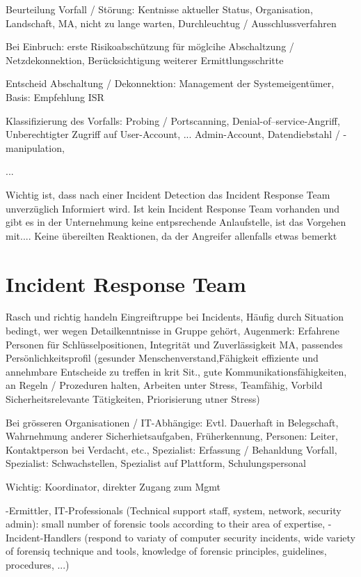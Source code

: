Beurteilung Vorfall / Störung: Kentnisse aktueller Status, Organisation, Landschaft, MA, nicht zu lange warten, Durchleuchtug / Ausschlussverfahren

Bei Einbruch: erste Risikoabschützung für möglcihe Abschaltzung / Netzdekonnektion, Berücksichtigung weiterer Ermittlungsschritte

Entscheid Abschaltung / Dekonnektion: Management der Systemeigentümer, Basis: Empfehlung ISR

Klassifizierung  des Vorfalls: Probing  / Portscanning, Denial-of--service-Angriff, Unberechtigter Zugriff auf User-Account, ... Admin-Account, Datendiebstahl / -manipulation,

...

Wichtig ist, dass nach einer Incident Detection das Incident Response Team unverzüglich Informiert wird. Ist kein Incident Response Team vorhanden und gibt es in der Unternehmung keine entpsrechende Anlaufstelle, ist das Vorgehen mit....
Keine übereilten Reaktionen, da der Angreifer allenfalls etwas bemerkt



\section{Incident Response Team}
Rasch und richtig handeln
Eingreiftruppe bei Incidents, Häufig durch Situation bedingt, wer wegen Detailkenntnisse in Gruppe gehört,
Augenmerk: Erfahrene Personen für Schlüsselpositionen, Integrität und Zuverlässigkeit MA, passendes Persönlichkeitsprofil (gesunder Menschenverstand,Fähigkeit effiziente und annehmbare Entscheide zu treffen in krit Sit., gute Kommunikationsfähigkeiten, an Regeln / Prozeduren halten, Arbeiten unter Stress, Teamfähig, Vorbild Sicherheitsrelevante Tätigkeiten, Priorisierung utner Stress)

Bei grösseren Organisationen / IT-Abhängige: Evtl. Dauerhaft in Belegschaft, Wahrnehmung anderer Sicherhietsaufgaben, Früherkennung, Personen: Leiter, Kontaktperson bei Verdacht, etc., Spezialist: Erfassung / Behanldung Vorfall, Spezialist: Schwachstellen, Spezialist auf Plattform, Schulungspersonal

Wichtig: Koordinator, direkter Zugang zum Mgmt

-Ermittler, IT-Professionals (Technical support staff, system, network, security admin): small number of forensic tools according to their area of expertise, 
-Incident-Handlers (respond to variaty of computer security incidents, wide variety of forensiq technique and tools, knowledge of forensic principles, guidelines, procedures, ...)

